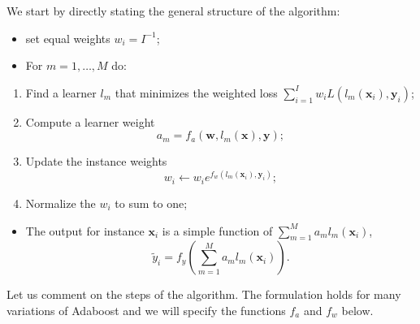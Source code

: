 \documentclass[]{krantz}
\providecommand{\tightlist}{%
  \setlength{\itemsep}{0pt}\setlength{\parskip}{0pt}}
\theoremstyle{definition}
\theoremstyle{definition}
\theoremstyle{definition}
\theoremstyle{remark}
\begin{document}
We start by directly stating the general structure of the algorithm:

\begin{itemize}
\tightlist
\item
  set equal weights \(w_i=I^{-1}\);\\
\item
  For \(m=1,\dots,M\) do:
\end{itemize}

\begin{enumerate}
\def\labelenumi{\arabic{enumi}.}
\tightlist
\item
  Find a learner \(l_m\) that minimizes the weighted loss
  \(\sum_{i=1}^Iw_iL(l_m(\textbf{x}_i),\textbf{y}_i)\);
\item
  Compute a learner weight \begin{equation}
  \label{eq:adaboostam}
  a_m=f_a(\textbf{w},l_m(\textbf{x}),\textbf{y});
  \end{equation}
\item
  Update the instance weights \begin{equation}
  \label{eq:adaboostw}
  w_i \leftarrow w_ie^{f_w(l_m(\textbf{x}_i), \textbf{y}_i)};
  \end{equation}
\item
  Normalize the \(w_i\) to sum to one;
\end{enumerate}

\begin{itemize}
\tightlist
\item
  The output for instance \(\textbf{x}_i\) is a simple function of
  \(\sum_{m=1}^M a_ml_m(\textbf{x}_i)\), \begin{equation}
  \label{eq:adaboosty}
  \tilde{y}_i=f_y\left(\sum_{m=1}^M a_ml_m(\textbf{x}_i) \right).
  \end{equation}
\end{itemize}

Let us comment on the steps of the algorithm. The formulation holds for
many variations of Adaboost and we will specify the functions \(f_a\)
and \(f_w\) below.
\end{document}
